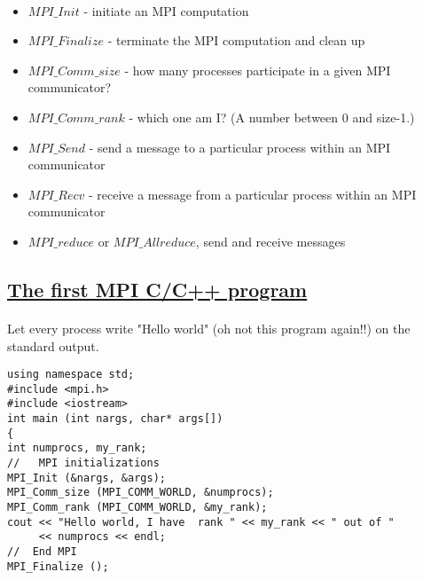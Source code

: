 \documentclass[%
oneside,                 %
final,                   %
10pt]{article}
\begin{document}
\paragraph{}



\begin{itemize}
\item $MPI\_Init$ - initiate an MPI computation

\item $MPI\_Finalize$ - terminate the MPI computation and clean up

\item $MPI\_Comm\_size$ - how many processes participate in a given MPI communicator?

\item $MPI\_Comm\_rank$ - which one am I? (A number between 0 and size-1.)

\item $MPI\_Send$ - send a message to a particular process within an MPI communicator

\item $MPI\_Recv$ - receive a message from a particular process within an MPI communicator

\item $MPI\_reduce$  or $MPI\_Allreduce$, send and receive messages
\end{itemize}

\noindent




\subsection*{\href{{https://github.com/CompPhysics/ComputationalPhysics2/blob/gh-pages/doc/Programs/LecturePrograms/programs/MPI/chapter07/program2.cpp}}{The first MPI C/C++ program}}

\paragraph{}


Let every process write "Hello world" (oh not this program again!!) on the standard output. 
\begin{verbatim}
using namespace std;
#include <mpi.h>
#include <iostream>
int main (int nargs, char* args[])
{
int numprocs, my_rank;
//   MPI initializations
MPI_Init (&nargs, &args);
MPI_Comm_size (MPI_COMM_WORLD, &numprocs);
MPI_Comm_rank (MPI_COMM_WORLD, &my_rank);
cout << "Hello world, I have  rank " << my_rank << " out of " 
     << numprocs << endl;
//  End MPI
MPI_Finalize ();
\end{verbatim}
\end{document}
